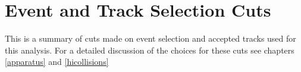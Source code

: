 \chapter{Event and Track Selection Cuts} %
This is a summary of cuts made on event selection and accepted tracks used for this analysis. For a detailed discussion of the choices for these cuts see chapters \ref{apparatus} and \ref{hicollisions}

\begin{table}
\end{table}